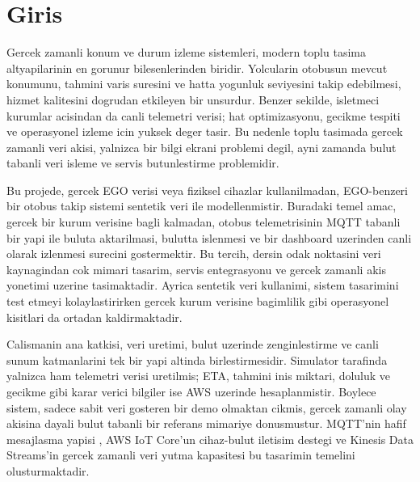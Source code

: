 \section{Giris}

Gercek zamanli konum ve durum izleme sistemleri, modern toplu tasima altyapilarinin en gorunur bilesenlerinden biridir. Yolcularin otobusun mevcut konumunu, tahmini varis suresini ve hatta yogunluk seviyesini takip edebilmesi, hizmet kalitesini dogrudan etkileyen bir unsurdur. Benzer sekilde, isletmeci kurumlar acisindan da canli telemetri verisi; hat optimizasyonu, gecikme tespiti ve operasyonel izleme icin yuksek deger tasir. Bu nedenle toplu tasimada gercek zamanli veri akisi, yalnizca bir bilgi ekrani problemi degil, ayni zamanda bulut tabanli veri isleme ve servis butunlestirme problemidir.

Bu projede, gercek EGO verisi veya fiziksel cihazlar kullanilmadan, EGO-benzeri bir otobus takip sistemi sentetik veri ile modellenmistir. Buradaki temel amac, gercek bir kurum verisine bagli kalmadan, otobus telemetrisinin MQTT tabanli bir yapi ile buluta aktarilmasi, bulutta islenmesi ve bir dashboard uzerinden canli olarak izlenmesi surecini gostermektir. Bu tercih, dersin odak noktasini veri kaynagindan cok mimari tasarim, servis entegrasyonu ve gercek zamanli akis yonetimi uzerine tasimaktadir. Ayrica sentetik veri kullanimi, sistem tasarimini test etmeyi kolaylastirirken gercek kurum verisine bagimlilik gibi operasyonel kisitlari da ortadan kaldirmaktadir.

Calismanin ana katkisi, veri uretimi, bulut uzerinde zenginlestirme ve canli sunum katmanlarini tek bir yapi altinda birlestirmesidir. Simulator tarafinda yalnizca ham telemetri verisi uretilmis; ETA, tahmini inis miktari, doluluk ve gecikme gibi karar verici bilgiler ise AWS uzerinde hesaplanmistir. Boylece sistem, sadece sabit veri gosteren bir demo olmaktan cikmis, gercek zamanli olay akisina dayali bulut tabanli bir referans mimariye donusmustur. MQTT'nin hafif mesajlasma yapisi \cite{mqtt311}, AWS IoT Core'un cihaz-bulut iletisim destegi \cite{aws_iot_mqtt} ve Kinesis Data Streams'in gercek zamanli veri yutma kapasitesi \cite{kinesis_intro} bu tasarimin temelini olusturmaktadir.
